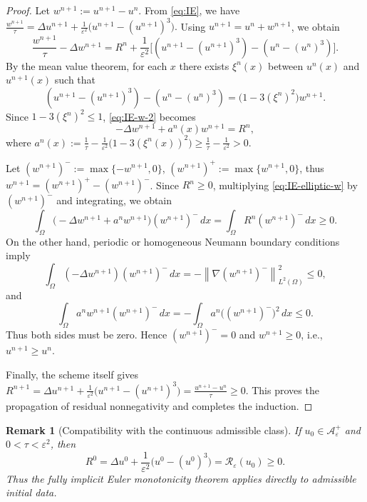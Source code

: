 \documentclass[final, 3p, times]{elsarticle}%
\newcommand{\eps}{\varepsilon}
\newcommand{\Reps}{\mathcal R_\varepsilon}
\newcommand{\Aepsp}{\mathcal A_\varepsilon^+}
\newcommand{\Aeps}{\Aepsp}
\newcommand{\dt}{\tau}
\newtheorem{remark}[theorem]{Remark}
\begin{document}
\begin{proof}
Let \(w^{n+1}:=u^{n+1}-u^n\). From \eqref{eq:IE},
we have
$
 \frac{w^{n+1}}{\dt}=\Delta u^{n+1}+\frac{1}{\eps^2}\bigl(u^{n+1}-(u^{n+1})^3\bigr).
$
Using \(u^{n+1}=u^n+w^{n+1}\), we obtain
\begin{equation}
    \frac{w^{n+1}}{\dt}-\Delta w^{n+1}
    =R^n+\frac{1}{\eps^2}\bigl[(u^{n+1}-(u^{n+1})^3)-(u^n-(u^n)^3)\bigr].
    \label{eq:IE-w-2}
\end{equation}
By the mean value theorem, for each \(x\) there exists \(\xi^n(x)\) between \(u^n(x)\) and \(u^{n+1}(x)\) such that
\[
    (u^{n+1}-(u^{n+1})^3)-(u^n-(u^n)^3)
    =\bigl(1-3(\xi^n)^2\bigr)w^{n+1}.
\]
Since \(1-3(\xi^n)^2 \le1\), \eqref{eq:IE-w-2} becomes
\begin{equation}
    -\Delta w^{n+1}+a^n(x)w^{n+1}=R^n,
    \label{eq:IE-elliptic-w}
\end{equation}
where $ a^n(x):=\frac{1}{\dt}-\frac{1}{\eps^2}\bigl(1-3(\xi^n(x))^2\bigr)\ge
    \frac{1}{\dt}-\frac{1}{\eps^2}> 0.$

Let \((w^{n+1})^-:=\max\{-w^{n+1},0\}\), \((w^{n+1})^+:=\max\{w^{n+1},0\}\), thus
   $ w^{n+1}=(w^{n+1})^+-(w^{n+1})^-$.
Since \(R^n\ge0\), multiplying \eqref{eq:IE-elliptic-w} by \((w^{n+1})^-\) and integrating, we obtain
\[
    \int_\Omega\bigl(-\Delta w^{n+1}+a^n w^{n+1}\bigr)(w^{n+1})^-\,dx
    =
    \int_\Omega R^n(w^{n+1})^-\,dx\ge0.
\]
On the other hand, periodic or homogeneous Neumann boundary conditions imply
\[
    \int_\Omega (-\Delta w^{n+1})(w^{n+1})^-\,dx
    =-\left\|\nabla (w^{n+1})^-\right\|_{L^2(\Omega)}^2\le0,
\]
and
\[
    \int_\Omega a^n w^{n+1}(w^{n+1})^-\,dx
    =-\int_\Omega a^n\bigl((w^{n+1})^-\bigr)^2\,dx\le0.
\]
Thus both sides must be zero. Hence \((w^{n+1})^-=0\) and \(w^{n+1}\ge0\), i.e., \(u^{n+1}\ge u^n\).

Finally, the scheme itself gives
$
    R^{n+1}=\Delta u^{n+1}+\frac{1}{\eps^2}\bigl(u^{n+1}-(u^{n+1})^3\bigr)=\frac{u^{n+1}-u^n}{\dt}\ge0.
$
This proves the propagation of residual nonnegativity and completes the induction.
\end{proof}

\begin{remark}[Compatibility with the continuous admissible class]
If \(u_0\in\Aeps\) and \(0<\dt<\eps^2\), then
\[
    R^0=\Delta u^0+\frac{1}{\eps^2}\bigl(u^0-(u^0)^3\bigr)=\Reps(u_0)\ge0.
\]
Thus the fully implicit Euler monotonicity theorem applies directly to admissible initial data.
\end{remark}
\end{document}
